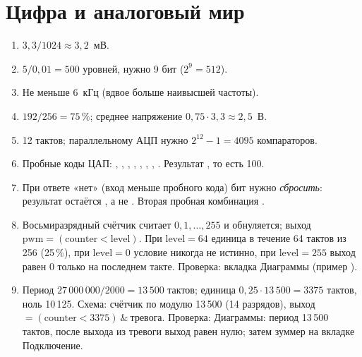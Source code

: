 \section*{Цифра и аналоговый мир}
\begin{enumerate}
  \item {} $3{,}3/1024\approx 3{,}2$~мВ.
  \item {} $5/0{,}01 = 500$ уровней, нужно 9 бит ($2^9=512$).
  \item {} Не меньше 6~кГц (вдвое больше наивысшей частоты).
  \item {} $192/256=75\,\%$; среднее напряжение $0{,}75\cdot 3{,}3\approx 2{,}5$~В.
  \item {} 12 тактов; параллельному АЦП нужно $2^{12}-1 = 4095$ компараторов.
  \item {} Пробные коды ЦАП: , , , , , , , . Результат , то есть 100.
  \item {} При ответе «нет» (вход меньше пробного кода) бит нужно \emph{сбросить}: результат остаётся , а не . Вторая пробная комбинация .
  \item {} Восьмиразрядный счётчик считает $0,1,\ldots,255$ и обнуляется; выход $\text{pwm}=(\text{counter}<\text{level})$. При $\text{level}=64$ единица в течение 64 тактов из 256 (25\,\%), при $\text{level}=0$ условие никогда не истинно, при $\text{level}=255$ выход равен 0 только на последнем такте. Проверка: вкладка Диаграммы (пример ).
  \item {} Период $27\,000\,000/2000=13\,500$ тактов; единица $0{,}25\cdot 13\,500=3375$ тактов, ноль 10\,125. Схема: счётчик по модулю 13\,500 (14 разрядов), выход $=(\text{counter}<3375)\ \&\ \text{тревога}$. Проверка: Диаграммы: период 13\,500 тактов, после выхода из тревоги выход равен нулю; затем зуммер на вкладке Подключение.
\end{enumerate}

